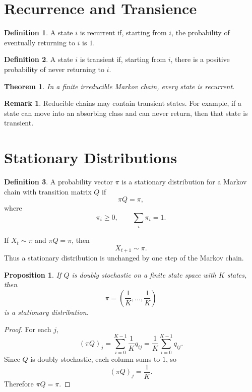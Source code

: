 \documentclass[12pt,oneside]{book}
\numberwithin{equation}{section}
\theoremstyle{definition}
\newtheorem{definition}{Definition}[section]
\newtheorem{remark}{Remark}[section]
\theoremstyle{plain}
\newtheorem{theorem}{Theorem}[section]
\newtheorem{proposition}{Proposition}[section]
\theoremstyle{remark}
\begin{document}
\section{Recurrence and Transience}

\begin{definition}
A state $i$ is recurrent if, starting from $i$, the probability of eventually returning to $i$ is $1$.
\end{definition}

\begin{definition}
A state $i$ is transient if, starting from $i$, there is a positive probability of never returning to $i$.
\end{definition}

\begin{theorem}
In a finite irreducible Markov chain, every state is recurrent.
\end{theorem}

\begin{remark}
Reducible chains may contain transient states. For example, if a state can move into an absorbing class and can never return, then that state is transient.
\end{remark}

\section{Stationary Distributions}

\begin{definition}
A probability vector $\pi$ is a stationary distribution for a Markov chain with transition matrix $Q$ if
\[
\pi Q=\pi,
\]
where
\[
\pi_i\ge 0,
\qquad
\sum_i \pi_i=1.
\]
\end{definition}

If $X_t\sim \pi$ and $\pi Q=\pi$, then
\[
X_{t+1}\sim \pi.
\]
Thus a stationary distribution is unchanged by one step of the Markov chain.

\begin{proposition}
If $Q$ is doubly stochastic on a finite state space with $K$ states, then
\[
\pi=\left(\frac{1}{K},\ldots,\frac{1}{K}\right)
\]
is a stationary distribution.
\end{proposition}

\begin{proof}
For each $j$,
\[
(\pi Q)_j
=
\sum_{i=0}^{K-1}\frac{1}{K}q_{ij}
=
\frac{1}{K}\sum_{i=0}^{K-1}q_{ij}.
\]
Since $Q$ is doubly stochastic, each column sums to $1$, so
\[
(\pi Q)_j=\frac{1}{K}.
\]
Therefore $\pi Q=\pi$.
\end{proof}
\end{document}
